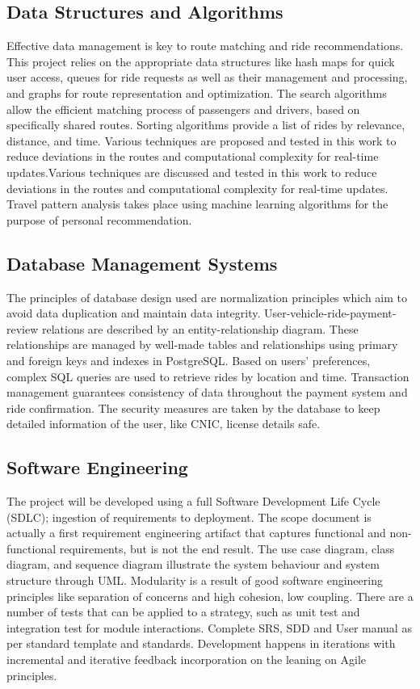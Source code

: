 \subsection{Data Structures and Algorithms}

Effective data management is key to route matching and ride recommendations. This project relies on the appropriate data structures like hash maps for quick user access, queues for ride requests as well as their management and processing, and graphs for route representation and optimization. The search algorithms allow the efficient matching process of passengers and drivers, based on specifically shared routes. Sorting algorithms provide a list of rides by relevance, distance, and time. Various techniques are proposed and tested in this work to reduce deviations in the routes and computational complexity for real-time updates.Various techniques are discussed and tested in this work to reduce deviations in the routes and computational complexity for real-time updates. Travel pattern analysis takes place using machine learning algorithms for the purpose of personal recommendation.

\subsection{Database Management Systems}

The principles of database design used are normalization principles which aim to avoid data duplication and maintain data integrity. User-vehicle-ride-payment-review relations are described by an entity-relationship diagram. These relationships are managed by well-made tables and relationships using primary and foreign keys and indexes in PostgreSQL. Based on users' preferences, complex SQL queries are used to retrieve rides by location and time. Transaction management guarantees consistency of data throughout the payment system and ride confirmation. The security measures are taken by the database to keep detailed information of the user, like CNIC, license details safe.


\subsection{Software Engineering}

The project will be developed using a full Software Development Life Cycle (SDLC); ingestion of requirements to deployment. The scope document is actually a first requirement engineering artifact that captures functional and non-functional requirements, but is not the end result. The use case diagram, class diagram, and sequence diagram illustrate the system behaviour and system structure through UML. Modularity is a result of good software engineering principles like separation of concerns and high cohesion, low coupling. There are a number of tests that can be applied to a strategy, such as unit test and integration test for module interactions. Complete SRS, SDD and User manual as per standard template and standards. Development happens in iterations with incremental and iterative feedback incorporation on the leaning on Agile principles.

